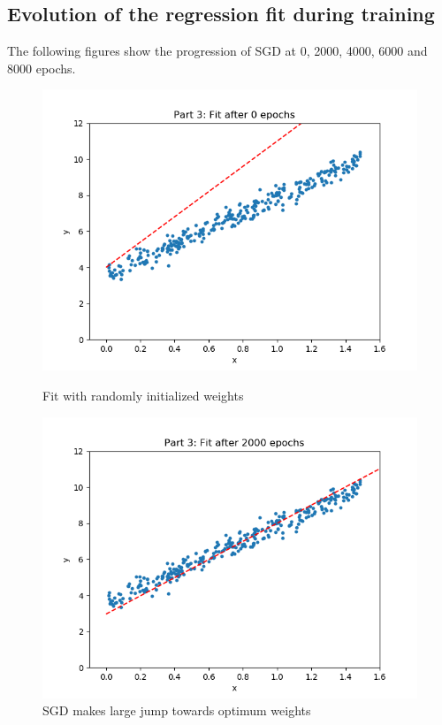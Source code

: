 \documentclass[paper=a4, fontsize=11pt]{scrartcl} %
\numberwithin{equation}{section} %
\numberwithin{figure}{section} %
\numberwithin{table}{section} %
\begin{document}
\subsection{Evolution of the regression fit during training}
The following figures show the progression of SGD at 0, 2000, 4000, 6000 and 8000 epochs.

\begin{figure}[H]
    \includegraphics[width=\linewidth]{q2p31.png}
    \caption{Fit with randomly initialized weights}
    \label{fig:q2p31}
    \includegraphics[width=\linewidth]{q2p32.png}
    \caption{SGD makes large jump towards optimum weights}
    \label{fig:q2p32}
\end{figure}
\end{document}
